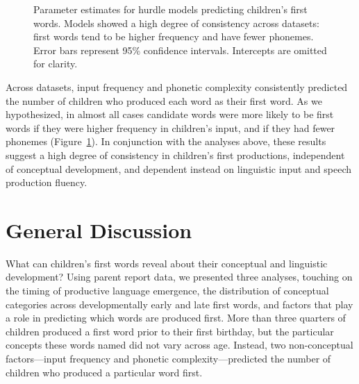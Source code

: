 \documentclass[10pt,letterpaper]{article}
\begin{document}
\begin{figure}[tb]
\caption{\label{fig:hurdles} Parameter estimates for hurdle models predicting children's first words. Models showed a high degree of consistency across datasets: first words tend to be higher frequency and have fewer phonemes. Error bars represent 95\% confidence intervals. Intercepts are omitted for clarity.}
\end{figure}


Across datasets, input frequency and phonetic complexity consistently predicted the number of children who produced each word as their first word. As we hypothesized, in almost all cases candidate words were more likely to be first words if they were higher frequency in children's input, and if they had fewer phonemes (Figure~\ref{fig:hurdles}). In conjunction with the analyses above, these results suggest a high degree of consistency in children's first productions, independent of conceptual development, and dependent instead on linguistic input and speech production fluency.

\section{General Discussion}

What can children's first words reveal about their conceptual and linguistic development? Using parent report data, we presented three analyses, touching on the timing of productive language emergence, the distribution of conceptual categories across developmentally early and late first words, and factors that play a role in predicting which words are produced first. More than three quarters of children produced a first word prior to their first birthday, but the particular concepts these words named did not vary across age. Instead, two non-conceptual factors---input frequency and phonetic complexity---predicted the number of children who produced a particular word first.
\end{document}
